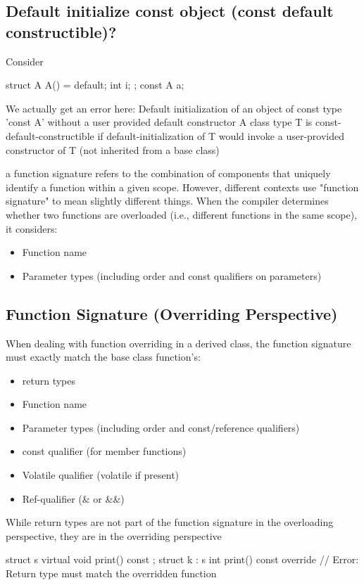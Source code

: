 \documentclass{report}
\begin{document}
    \bigbreak \noindent 
    \subsection{Default initialize const object (const default constructible)?}
    \bigbreak \noindent 
    Consider
    \bigbreak \noindent 
    \begin{cppcode}
        struct A {
            A() = default;
            int i;
        } ;
        const A a;
    \end{cppcode}
    \bigbreak \noindent 
    We actually get an error here: Default initialization of an object of const type 'const A' without a user provided default constructor
    \bigbreak \noindent 
    A class type T is const-default-constructible if default-initialization of T would invoke a user-provided constructor of T (not inherited from a base class)


    \pagebreak 
    \bigbreak \noindent 
    a function signature refers to the combination of components that uniquely identify a function within a given scope. However, different contexts use "function signature" to mean slightly different things.
    \bigbreak \noindent 
    When the compiler determines whether two functions are overloaded (i.e., different functions in the same scope), it considers:
    \bigbreak \noindent 
    \begin{itemize}
        \item Function name
        \item Parameter types (including order and const qualifiers on parameters)
    \end{itemize}

    \bigbreak \noindent 
    \subsection{Function Signature (Overriding Perspective)}
    \bigbreak \noindent 
    When dealing with function overriding in a derived class, the function signature must exactly match the base class function's:
    \begin{itemize}
        \item return types
        \item Function name
        \item Parameter types (including order and const/reference qualifiers)
        \item const qualifier (for member functions)
        \item Volatile qualifier (volatile if present)
        \item Ref-qualifier (\& or \&\&)
    \end{itemize}
    \bigbreak \noindent 
    While return types are not part of the function signature in the overloading perspective, they are in the overriding perspective
    \bigbreak \noindent 
    \begin{cppcode}
        struct s {
            virtual void print() const {}
        };
        struct k : s {
            int print() const override {} // Error: Return type must match the overridden function
        }
    \end{cppcode}
\end{document}
